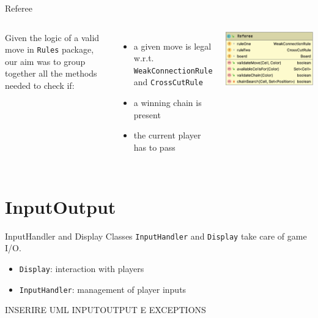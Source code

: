 \documentclass{beamer}
\begin{document}
\begin{frame}{Referee}
	\begin{columns}
	Given the logic of a valid move in \texttt{Rules} package, our aim was to group together all the methods needed to check if:
	\vspace{0.4cm}
	\begin{itemize}
		\item a given move is legal w.r.t. \texttt{WeakConnectionRule} and \texttt{CrossCutRule}
		\vspace{0.25cm}
		\item a winning chain is present
		\vspace{0.25cm}
		\item the current player has to pass
	\end{itemize}
	
	
		\includegraphics[scale=0.27]{images/referee-class.jpg}
	
	\end{columns}
\end{frame}


\section{InputOutput}

\begin{frame}{InputHandler and Display}
	Classes \texttt{InputHandler} and \texttt{Display} take care of game I/O.

	\begin{itemize}
		\item \texttt{Display}: interaction with players
	 	\item \texttt{InputHandler}: management of player inputs
	\end{itemize}
	
	INSERIRE UML INPUTOUTPUT E EXCEPTIONS
\end{frame}
\end{document}
